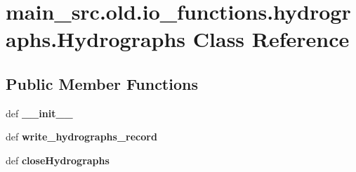 \hypertarget{classmain__src_8old_1_1io__functions_1_1hydrographs_1_1Hydrographs}{\section{main\-\_\-src.\-old.\-io\-\_\-functions.\-hydrographs.\-Hydrographs Class Reference}
\label{classmain__src_8old_1_1io__functions_1_1hydrographs_1_1Hydrographs}
}
\subsection*{Public Member Functions}
\begin{DoxyCompactItemize}
\item 
\hypertarget{classmain__src_8old_1_1io__functions_1_1hydrographs_1_1Hydrographs_a299ee39fc0633257b25b23b5f52a2fd7}{def {\bfseries \-\_\-\-\_\-init\-\_\-\-\_\-}}\label{classmain__src_8old_1_1io__functions_1_1hydrographs_1_1Hydrographs_a299ee39fc0633257b25b23b5f52a2fd7}

\item 
\hypertarget{classmain__src_8old_1_1io__functions_1_1hydrographs_1_1Hydrographs_a3a8d4228c10f3c554bad07e99eb77e76}{def {\bfseries write\-\_\-hydrographs\-\_\-record}}\label{classmain__src_8old_1_1io__functions_1_1hydrographs_1_1Hydrographs_a3a8d4228c10f3c554bad07e99eb77e76}

\item 
\hypertarget{classmain__src_8old_1_1io__functions_1_1hydrographs_1_1Hydrographs_afd089ad2fa3921c7bbdfc9afaed0f32f}{def {\bfseries close\-Hydrographs}}\label{classmain__src_8old_1_1io__functions_1_1hydrographs_1_1Hydrographs_afd089ad2fa3921c7bbdfc9afaed0f32f}

\end{DoxyCompactItemize}
